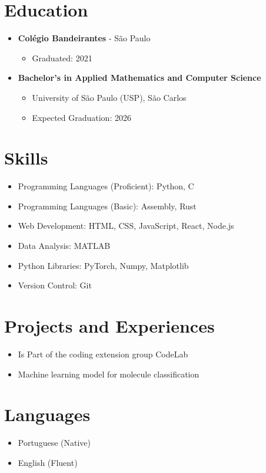 \documentclass[a4paper,11pt]{article}
\begin{document}
\section*{Education}
\vspace{-0.3em}
\begin{itemize}[leftmargin=*, itemsep=-2pt]
  \item \textbf{Colégio Bandeirantes} - São Paulo
    \begin{itemize}[itemsep=-1pt]
      \item Graduated: 2021
    \end{itemize}
  \item \textbf{Bachelor's in Applied Mathematics and Computer Science}
    \begin{itemize}[itemsep=-1pt]
      \item University of São Paulo (USP), São Carlos
      \item Expected Graduation: 2026
    \end{itemize}
\end{itemize}
\vspace{-0.3em}

\section*{Skills}
\vspace{-0.3em}
\begin{itemize}[leftmargin=*, itemsep=-2pt]
  \item Programming Languages (Proficient): Python, C
  \item Programming Languages (Basic): Assembly, Rust
  \item Web Development: HTML, CSS, JavaScript, React, Node.js
  \item Data Analysis: MATLAB
  \item Python Libraries: PyTorch, Numpy, Matplotlib
  \item Version Control: Git
\end{itemize}
\vspace{-0.3em}

\section*{Projects and Experiences}
\vspace{-0.3em}
\begin{itemize}[leftmargin=*, itemsep=-2pt]
  \item Is Part of the coding extension group CodeLab
  \item Machine learning model for molecule classification
\end{itemize}
\vspace{-0.3em}

\section*{Languages}
\vspace{-0.3em}
\begin{itemize}[leftmargin=*, itemsep=-2pt]
  \item Portuguese (Native)
  \item English (Fluent)
\end{itemize}
\end{document}
